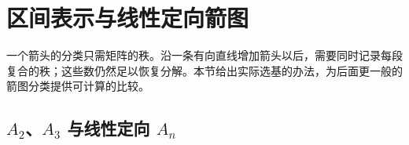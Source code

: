 
\section{区间表示与线性定向箭图}
\label{b5:sec:0903}


%
%

一个箭头的分类只需矩阵的秩。沿一条有向直线增加箭头以后，需要同时记录每段复合的秩；这些数仍然足以恢复分解。本节给出实际选基的办法，为后面更一般的箭图分类提供可计算的比较。

\subsection{\texorpdfstring{\(A_2\)、\(A_3\) 与线性定向 \(A_n\)}{A2、A3 与线性定向 An}}
\label{b5:subsec:0903:01}

